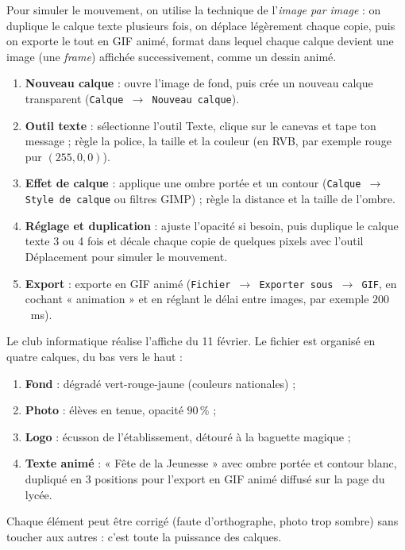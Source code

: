 \documentclass[11pt]{article}
\newcommand{\cle}[1]{{\popxbold\color{popdark}#1}}
\begin{document}
Pour simuler le mouvement, on utilise la technique de l'\emph{image par image} : on duplique le calque texte plusieurs fois, on déplace légèrement chaque copie, puis on exporte le tout en \cle{GIF animé}, format dans lequel chaque calque devient une image (une \emph{frame}) affichée successivement, comme un dessin animé.

\begin{methode}
\begin{enumerate}
\item \textbf{Nouveau calque} : ouvre l'image de fond, puis crée un nouveau calque transparent (\texttt{Calque $\to$ Nouveau calque}).
\item \textbf{Outil texte} : sélectionne l'outil Texte, clique sur le canevas et tape ton message ; règle la police, la taille et la couleur (en RVB, par exemple rouge pur $(255, 0, 0)$).
\item \textbf{Effet de calque} : applique une ombre portée et un contour (\texttt{Calque $\to$ Style de calque} ou filtres GIMP) ; règle la distance et la taille de l'ombre.
\item \textbf{Réglage et duplication} : ajuste l'opacité si besoin, puis duplique le calque texte 3 ou 4 fois et décale chaque copie de quelques pixels avec l'outil Déplacement pour simuler le mouvement.
\item \textbf{Export} : exporte en GIF animé (\texttt{Fichier $\to$ Exporter sous $\to$ GIF}, en cochant « animation » et en réglant le délai entre images, par exemple $200$~ms).
\end{enumerate}
\end{methode}

\begin{exemplebox}
Le club informatique réalise l'affiche du 11 février. Le fichier est organisé en quatre calques, du bas vers le haut :
\begin{enumerate}
\item \textbf{Fond} : dégradé vert-rouge-jaune (couleurs nationales) ;
\item \textbf{Photo} : élèves en tenue, opacité $90\,\%$ ;
\item \textbf{Logo} : écusson de l'établissement, détouré à la baguette magique ;
\item \textbf{Texte animé} : « Fête de la Jeunesse » avec ombre portée et contour blanc, dupliqué en 3 positions pour l'export en GIF animé diffusé sur la page du lycée.
\end{enumerate}
Chaque élément peut être corrigé (faute d'orthographe, photo trop sombre) sans toucher aux autres : c'est toute la puissance des calques.
\end{exemplebox}
\end{document}
